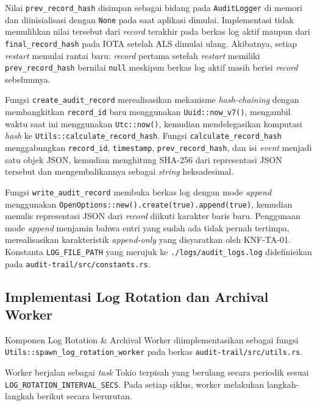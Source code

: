 Nilai \texttt{prev\_record\_hash} disimpan sebagai bidang pada
\texttt{AuditLogger} di memori dan diinisialisasi dengan \texttt{None} pada saat
aplikasi dimulai. Implementasi tidak memulihkan nilai tersebut dari
\textit{record} terakhir pada berkas log aktif maupun dari
\texttt{final\_record\_hash} pada IOTA setelah ALS dimulai ulang. Akibatnya, setiap \textit{restart} memulai rantai baru:
\textit{record} pertama setelah \textit{restart} memiliki
\texttt{prev\_record\_hash} bernilai \texttt{null} meskipun berkas log aktif
masih berisi \textit{record} sebelumnya.

Fungsi \texttt{create\_audit\_record} merealisasikan mekanisme
\textit{hash-chaining} dengan membangkitkan \texttt{record\_id} baru menggunakan
\texttt{Uuid::now\_v7()}, mengambil waktu saat ini menggunakan \texttt{Utc::now()},
kemudian mendelegasikan komputasi \textit{hash} ke
\texttt{Utils::calculate\_record\_hash}. Fungsi \texttt{calculate\_record\_hash}
menggabungkan \texttt{record\_id}, \texttt{timestamp}, \texttt{prev\_record\_hash},
dan isi \textit{event} menjadi satu objek JSON, kemudian menghitung SHA-256 dari
representasi JSON tersebut dan mengembalikannya sebagai \textit{string} heksadesimal.

Fungsi \texttt{write\_audit\_record} membuka berkas log dengan mode
\textit{append} menggunakan \texttt{OpenOptions::new().create(true).append(true)},
kemudian menulis representasi JSON dari \textit{record} diikuti karakter baris baru.
Penggunaan mode \textit{append} menjamin bahwa entri yang sudah ada tidak pernah
tertimpa, merealisasikan karakteristik \textit{append-only} yang disyaratkan oleh
KNF-TA-01. Konstanta \texttt{LOG\_FILE\_PATH} yang merujuk ke
\texttt{./logs/audit\_logs.log} didefinisikan pada \texttt{audit-trail/src/constants.rs}.

\subsection{Implementasi Log Rotation dan Archival Worker}

Komponen Log Rotation \& Archival Worker diimplementasikan sebagai fungsi
\texttt{Utils::spawn\_log\_rotation\_worker} pada berkas
\texttt{audit-trail/src/utils.rs}.

Worker berjalan sebagai \textit{task} Tokio terpisah yang berulang secara
periodik sesuai \texttt{LOG\_ROTATION\_INTERVAL\_SECS}. Pada setiap siklus,
worker melakukan langkah-langkah berikut secara berurutan.

